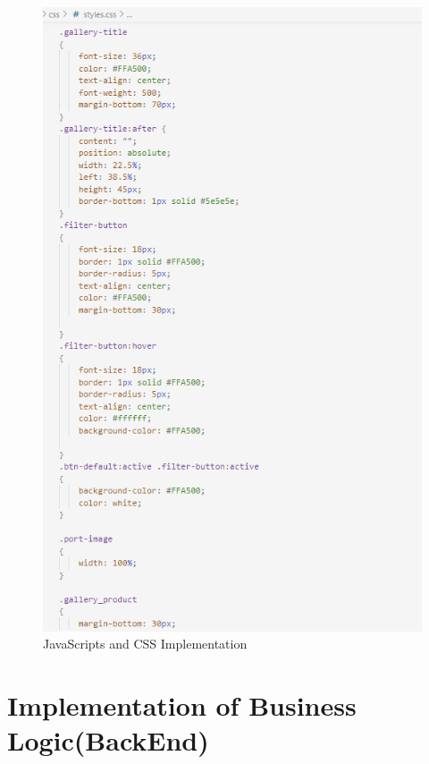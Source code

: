 \begin{figure}[H]
	\includegraphics[scale=0.5]{styles.png}
	\caption{JavaScripts and CSS Implementation}
	\label{JavaScripts and CSS Implementation}
\end{figure}

\section{ Implementation of Business Logic(BackEnd)  }


